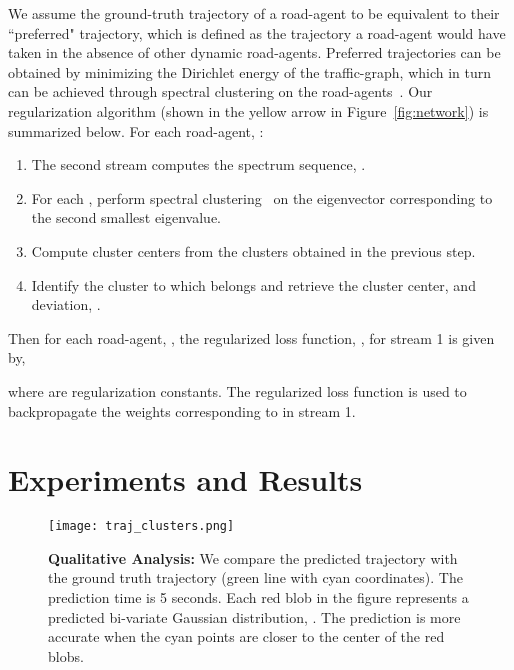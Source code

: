 \documentclass[10pt,twocolumn,letterpaper]{article}
\theoremstyle{plain}
\begin{document}
We assume the ground-truth trajectory of a road-agent to be equivalent to their ``preferred" trajectory, which is defined as the trajectory a road-agent would have taken in the absence of other dynamic road-agents.  Preferred trajectories can be obtained by minimizing the Dirichlet energy of the traffic-graph, which in turn can be achieved through spectral clustering on the road-agents~\cite{dirichlet}. Our regularization algorithm (shown in the yellow arrow in Figure~\ref{fig:network}) is summarized below. For each road-agent, : 

\begin{enumerate}[noitemsep]
    \item The second stream computes the spectrum sequence, .
    \item For each , perform spectral clustering~\cite{von2007tutorial} on the eigenvector corresponding to the second smallest eigenvalue.
    \item Compute cluster centers from the clusters obtained in the previous step.
    \item Identify the cluster to which  belongs and retrieve the cluster center,  and deviation, . 
\end{enumerate}
Then for each road-agent, , the regularized loss function, , for stream 1 is given by,



\noindent where  are regularization constants. The regularized loss function is used to backpropagate the weights corresponding to  in stream 1.


 
\section{Experiments and Results}

\begin{figure*}[h]
    \centering
    \texttt{[image: traj\_clusters.png]}
    \caption{\textbf{Qualitative Analysis:} We compare the predicted trajectory with the ground truth trajectory (green line with cyan coordinates). The prediction time is 5 seconds. Each red blob in the figure represents a predicted bi-variate Gaussian distribution, . The prediction is more accurate when the cyan points are closer to the center of the red blobs. }
    \label{fig: qual}
    \vspace{-10pt}
\end{figure*}
\end{document}
